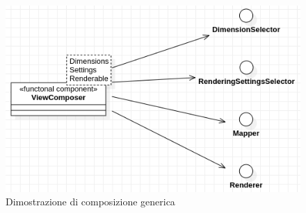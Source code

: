 \begin{figure}[h!]
  \centering
  \includegraphics[scale=0.55]{../../assets/classi_uml/comdelcomposer.png}
  \caption{Dimostrazione di composizione generica}
\end{figure}






